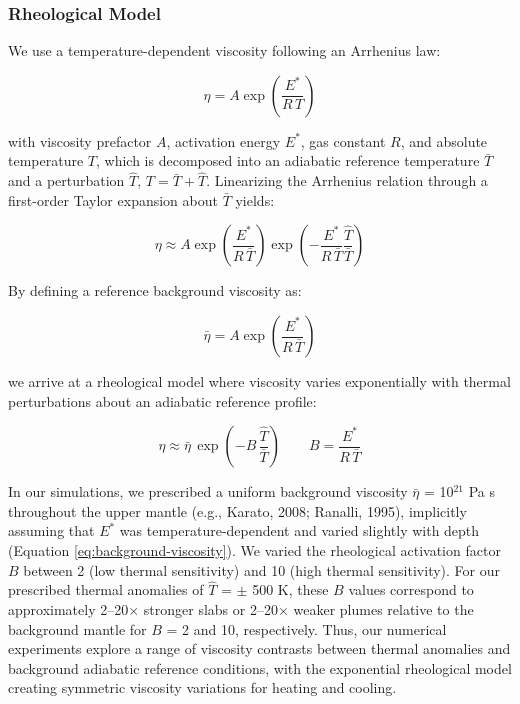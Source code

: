 \documentclass[draft,linenumbers]{agujournal2019}
\begin{document}
\subsubsection{Rheological Model}\label{sec:rheological-model}

We use a temperature-dependent viscosity following an Arrhenius law:

\begin{equation}
  \eta = A \exp\!\left(\frac{E^{\ast}}{R\,T}\right)
  \label{eq:arrhenius-viscosity}
\end{equation}

with viscosity prefactor \(A\), activation energy \(E^{\ast}\), gas
constant \(R\), and absolute temperature \(T\), which is decomposed into
an adiabatic reference temperature \(\bar{T}\) and a perturbation
\(\hat{T}\), \(T=\bar{T}+\hat{T}\). Linearizing the Arrhenius relation
through a first-order Taylor expansion about \(\bar{T}\) yields:

\begin{equation}
  \eta \approx A \exp\!\left(\frac{E^{\ast}}{R\,\bar{T}}\right) \exp\!\left(-\frac{E^{\ast}}{R\,\bar{T}}\frac{\hat{T}}{\bar{T}}\right)
  \label{eq:arrhenius-viscosity-expanded}
\end{equation}

By defining a reference background viscosity as:

\begin{equation}
  \bar{\eta} = A \exp\!\left(\frac{E^{\ast}}{R\,\bar{T}}\right)
  \label{eq:background-viscosity}
\end{equation}

we arrive at a rheological model where viscosity varies exponentially
with thermal perturbations about an adiabatic reference profile:

\begin{equation}
  \eta \approx \bar{\eta}\,\exp\!\left(-B\,\frac{\hat{T}}{\bar{T}}\right) \qquad B=\frac{E^{\ast}}{R\,\bar{T}}
  \label{eq:rheological-model}
\end{equation}

In our simulations, we prescribed a uniform background viscosity
\(\bar{\eta}\) = 10\(^{21}\) Pa s throughout the upper mantle (e.g.,
Karato, 2008; Ranalli, 1995), implicitly assuming that \(E^{\ast}\) was
temperature-dependent and varied slightly with depth (Equation
\ref{eq:background-viscosity}). We varied the rheological activation
factor \(B\) between 2 (low thermal sensitivity) and 10 (high thermal
sensitivity). For our prescribed thermal anomalies of \(\hat{T}\) =
\(\pm\) 500 K, these \(B\) values correspond to approximately
2--20\(\times\) stronger slabs or 2--20\(\times\) weaker plumes relative
to the background mantle for \(B\) = 2 and 10, respectively. Thus, our
numerical experiments explore a range of viscosity contrasts between
thermal anomalies and background adiabatic reference conditions, with
the exponential rheological model creating symmetric viscosity
variations for heating and cooling.
\end{document}
